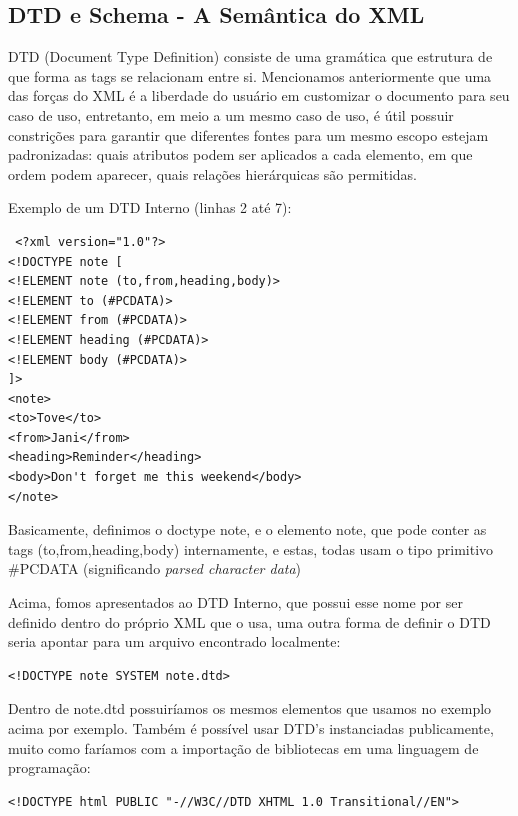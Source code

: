 \subsection{DTD e Schema - A Semântica do XML}

DTD (Document Type Definition) consiste de uma gramática que estrutura de que forma as tags se relacionam entre si. Mencionamos anteriormente que uma das forças do XML é a liberdade do usuário em customizar o documento para seu caso de uso, entretanto, em meio a um mesmo caso de uso, é útil possuir constrições para garantir que diferentes fontes para um mesmo escopo estejam padronizadas: quais atributos podem ser aplicados a cada elemento, em que ordem podem aparecer, quais relações hierárquicas são permitidas\cite{wikixml}.

Exemplo de um DTD Interno (linhas 2 até 7):
\begin{verbatim}
 <?xml version="1.0"?>
<!DOCTYPE note [
<!ELEMENT note (to,from,heading,body)>
<!ELEMENT to (#PCDATA)>
<!ELEMENT from (#PCDATA)>
<!ELEMENT heading (#PCDATA)>
<!ELEMENT body (#PCDATA)>
]>
<note>
<to>Tove</to>
<from>Jani</from>
<heading>Reminder</heading>
<body>Don't forget me this weekend</body>
</note> 
\end{verbatim}

Basicamente, definimos o doctype note, e o elemento note, que pode conter as tags (to,from,heading,body) internamente, e estas, todas usam o tipo primitivo #PCDATA (significando \textit{parsed character data})

Acima, fomos apresentados ao DTD Interno, que possui esse nome por ser definido dentro do próprio XML que o usa, uma outra forma de definir o DTD seria apontar para um arquivo encontrado localmente\cite{wikidtd}:

\begin{verbatim}
<!DOCTYPE note SYSTEM note.dtd>
\end{verbatim}

Dentro de note.dtd possuiríamos os mesmos elementos que usamos no exemplo acima por exemplo. Também é possível usar DTD's instanciadas publicamente, muito como faríamos com a importação de bibliotecas em uma linguagem de programação\cite{publicdtd}:

\begin{verbatim}
<!DOCTYPE html PUBLIC "-//W3C//DTD XHTML 1.0 Transitional//EN">
\end{verbatim}

